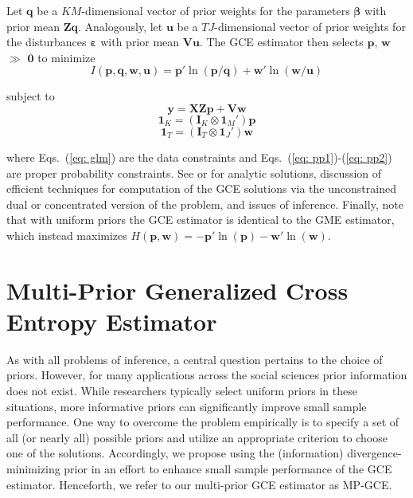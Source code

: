 \documentclass{elsarticle}
\begin{document}
Let $\mathbf{q}$ be a $KM$-dimensional vector of prior weights for the 
parameters $\mathbf{\beta}$ with prior mean $\mathbf{Zq}$.
Analogously, let $\mathbf{u}$ be a $TJ$-dimensional vector of prior weights 
for the disturbances $\mathbf{\varepsilon}$ with prior mean $\mathbf{Vu}$.
The GCE estimator then selects $\mathbf{p}$, $\mathbf{w}$ $\gg$ 
$\mathbf{0}$ to minimize 
\begin{equation}
I({\mathbf{p}, \mathbf{q}, \mathbf{w}, \mathbf{u}}) = 
\mathbf{p}' \ln (\mathbf{p}/\mathbf{q}) + 
\mathbf{w}' \ln (\mathbf{w}/\mathbf{u})
\label{eq: ce}
\end{equation}

\noindent
subject to
\begin{equation}
\mathbf{y} = \mathbf{X Z p} 
+ \mathbf{V w}
\label{eq: glm}
\end{equation}
\begin{equation}
\mathbf{1}_K = (\mathbf{I}_K \otimes \mathbf{1}_M')\mathbf{p}
\label{eq: pp1}
\end{equation}
\begin{equation}
\mathbf{1}_T = (\mathbf{I}_T \otimes \mathbf{1}_J')\mathbf{w}
\label{eq: pp2}
\end{equation}

\noindent
where Eqs.\ (\ref{eq: glm}) are the data constraints and Eqs.\ 
(\ref{eq: pp1})-(\ref{eq: pp2}) are proper probability constraints.
See \citet[Chap.\ 6]{golan1996} or \citet[Chap.\ 6]{golan2008} for analytic solutions, 
discussion of efficient techniques for computation of the GCE solutions via the 
unconstrained dual or concentrated version of the problem, and issues of inference.
Finally, note that with uniform priors the GCE estimator is identical to 
the GME estimator, which instead maximizes $H(\mathbf{p},\mathbf{w}) 
= - \mathbf{p}' \ln (\mathbf{p}) - \mathbf{w}' \ln (\mathbf{w})$.


\section{Multi-Prior Generalized Cross Entropy Estimator}
\label{sec: mp-gce}

As with all problems of inference, a central question pertains to the choice of 
priors. 
However, for many applications across the social sciences prior information 
does not exist. 
While researchers typically select uniform priors in these situations, more 
informative priors can significantly improve small sample performance.
One way to overcome the problem empirically is to specify a set of all (or 
nearly all) possible priors and utilize an appropriate criterion to choose one of 
the solutions.
Accordingly, we propose using the (information) divergence-minimizing 
prior in an effort to enhance small sample performance of the GCE 
estimator. 
Henceforth, we refer to our multi-prior GCE estimator as MP-GCE. 
\end{document}

